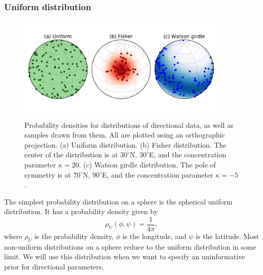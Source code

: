 \documentclass[preprint,12pt,authoryear]{elsarticle}
\begin{document}
\subsubsection{Uniform distribution}
\begin{figure}
\includegraphics[width=0.9\textwidth]{figures/cartoon/distributions.pdf}
\caption[Spherical probability distributions.]{Probability densities for distributions of directional data, as well as samples drawn from them. All are plotted using an orthographic projection. (a) Uniform distribution. (b) Fisher distribution. The center of the distribution is at $30^\circ$N, $30^\circ$E, and the concentration parameter $\kappa=20$. (c) Watson girdle distribution. The pole of symmetry is at $70^\circ$N, $90^\circ$E, and the concentration parameter $\kappa=-5$.}
\label{fig:distributions}
\end{figure}

The simplest probability distribution on a sphere is the spherical uniform distribution.
It has a probability density given by
\begin{equation}
  \rho_U(\phi, \psi) = \frac{1}{4 \pi},
\end{equation}
where $\rho_U$ is the probability density, $\phi$ is the longitude, and $\psi$ is the latitude.
Most non-uniform distributions on a sphere reduce to the uniform distribution in some limit.
We will use this distribution when we want to specify an uninformative prior for directional parameters.
\end{document}
